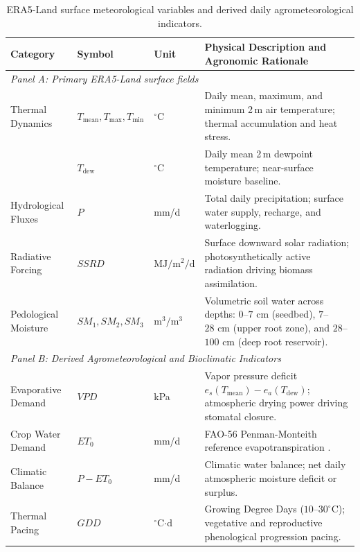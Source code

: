 \begin{table}[htbp]
\centering
\footnotesize
\setlength{\tabcolsep}{4pt}
\renewcommand{\arraystretch}{1.15}
\caption{ERA5-Land surface meteorological variables and derived daily agrometeorological indicators.}
\label{tab:weather_variables}
\begin{tabularx}{\textwidth}{p{2.4cm} p{2.6cm} p{1.3cm} >{\raggedright\arraybackslash}X}
\toprule
\textbf{Category} & \textbf{Symbol} & \textbf{Unit} & \textbf{Physical Description and Agronomic Rationale} \\
\midrule
\multicolumn{4}{l}{\textit{Panel A: Primary ERA5-Land surface fields}} \\
Thermal Dynamics & $T_{\text{mean}}, T_{\text{max}}, T_{\text{min}}$ & $^\circ$C & Daily mean, maximum, and minimum 2\,m air temperature; thermal accumulation and heat stress. \\
& $T_{\text{dew}}$ & $^\circ$C & Daily mean 2\,m dewpoint temperature; near-surface moisture baseline. \\
Hydrological Fluxes & $P$ & mm/d & Total daily precipitation; surface water supply, recharge, and waterlogging. \\
Radiative Forcing & $SSRD$ & $\text{MJ}/\text{m}^2/\text{d}$ & Surface downward solar radiation; photosynthetically active radiation driving biomass assimilation. \\
Pedological Moisture & $SM_1, SM_2, SM_3$ & $\text{m}^3/\text{m}^3$ & Volumetric soil water across depths: $0$--$7\text{ cm}$ (seedbed), $7$--$28\text{ cm}$ (upper root zone), and $28$--$100\text{ cm}$ (deep root reservoir). \\
\midrule
\multicolumn{4}{l}{\textit{Panel B: Derived Agrometeorological and Bioclimatic Indicators}} \\
Evaporative Demand & $VPD$ & kPa & Vapor pressure deficit $e_s(T_{\text{mean}}) - e_a(T_{\text{dew}})$; atmospheric drying power driving stomatal closure. \\
Crop Water Demand & $ET_0$ & mm/d & FAO-56 Penman-Monteith reference evapotranspiration \citep{Allen1998}. \\
Climatic Balance & $P - ET_0$ & mm/d & Climatic water balance; net daily atmospheric moisture deficit or surplus. \\
Thermal Pacing & $GDD$ & $^\circ$C$\cdot$d & Growing Degree Days ($10$--$30^\circ$C); vegetative and reproductive phenological progression pacing. \\

\end{tabularx}
\end{table}
